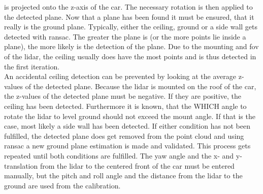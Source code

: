 is projected onto the z-axis of the car.
The necessary rotation is then applied to the detected plane.
Now that a plane has been found it must be ensured, that it really is the ground plane.
Typically, either the ceiling, ground or a side wall gets detected with \gls{ransac}.
The greater the plane is (or the more points lie inside a plane), the more likely is the detection of the plane.
Due to the mounting and \gls{fov} of the \gls{lidar}, the ceiling usually does have the most points and is thus detected in the first iteration.\\
An accidental ceiling detection can be prevented by looking at the average z-values of the detected plane.
Because the \gls{lidar} is mounted on the roof of the car, the z-values of the detected plane must be negative.
If they are positive, the ceiling has been detected.
Furthermore it is known, that the WHICH angle to rotate the \gls{lidar} to level ground should not exceed the mount angle.
If that is the case, most likely a side wall has been detected.
If either condition has not been fulfilled, the detected plane does get removed from the point cloud and using \gls{ransac} a new ground plane estimation is made and validated.
This process gets repeated until both conditions are fulfilled.
The yaw angle and the x- and y-translation from the \gls{lidar} to the centered front of the car
must be entered manually, but the pitch and roll angle and the distance from the \gls{lidar} to the ground are used from the calibration.


